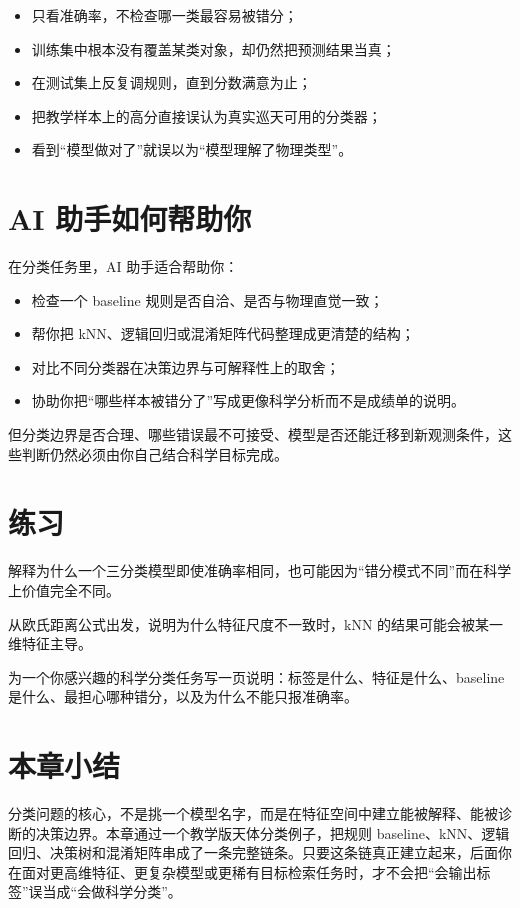 \begin{warnbox}[分类中的常见误区]
\begin{itemize}
    \item 只看准确率，不检查哪一类最容易被错分；
    \item 训练集中根本没有覆盖某类对象，却仍然把预测结果当真；
    \item 在测试集上反复调规则，直到分数满意为止；
    \item 把教学样本上的高分直接误认为真实巡天可用的分类器；
    \item 看到“模型做对了”就误以为“模型理解了物理类型”。
\end{itemize}
\end{warnbox}

\section{AI 助手如何帮助你}

在分类任务里，AI 助手适合帮助你：

\begin{itemize}
    \item 检查一个 baseline 规则是否自洽、是否与物理直觉一致；
    \item 帮你把 kNN、逻辑回归或混淆矩阵代码整理成更清楚的结构；
    \item 对比不同分类器在决策边界与可解释性上的取舍；
    \item 协助你把“哪些样本被错分了”写成更像科学分析而不是成绩单的说明。
\end{itemize}

但分类边界是否合理、哪些错误最不可接受、模型是否还能迁移到新观测条件，这些判断仍然必须由你自己结合科学目标完成。

\section{练习}

\begin{exercisebox}[基础练习]
解释为什么一个三分类模型即使准确率相同，也可能因为“错分模式不同”而在科学上价值完全不同。
\end{exercisebox}

\begin{exercisebox}[进阶练习]
从欧氏距离公式出发，说明为什么特征尺度不一致时，kNN 的结果可能会被某一维特征主导。
\end{exercisebox}

\begin{exercisebox}[开放练习]
为一个你感兴趣的科学分类任务写一页说明：标签是什么、特征是什么、baseline 是什么、最担心哪种错分，以及为什么不能只报准确率。
\end{exercisebox}

\section{本章小结}

分类问题的核心，不是挑一个模型名字，而是在特征空间中建立能被解释、能被诊断的决策边界。本章通过一个教学版天体分类例子，把规则 baseline、kNN、逻辑回归、决策树和混淆矩阵串成了一条完整链条。只要这条链真正建立起来，后面你在面对更高维特征、更复杂模型或更稀有目标检索任务时，才不会把“会输出标签”误当成“会做科学分类”。
